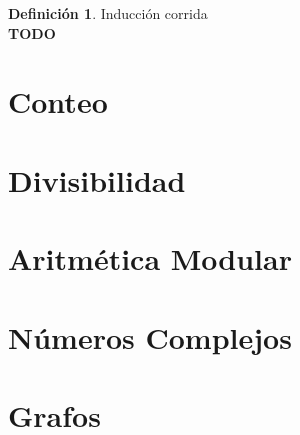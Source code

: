 \documentclass[9pt,a4paper]{article}
\theoremstyle{definition}
\newtheorem{defi}{Definición}
\theoremstyle{plain}
\begin{document}
\begin{defi} Inducción corrida \\ {\bfseries TODO}  \end{defi}

\part{Conteo}


\part{Divisibilidad}

\part{Aritmética Modular}

\part{Números Complejos}

\part{Grafos}
\end{document}
